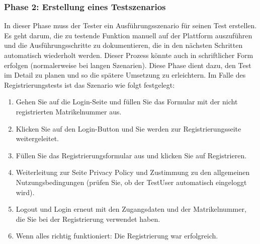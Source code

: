 \subsubsection{Phase 2: Erstellung eines Testszenarios}

In dieser Phase muss der Tester ein Ausführungsszenario für seinen 
Test erstellen. Es geht darum, die zu testende Funktion manuell
auf der Plattform auszuführen und die Ausführungsschritte zu 
dokumentieren, die in den nächsten Schritten automatisch wiederholt
werden. Dieser Prozess könnte auch in schriftlicher Form erfolgen
(normalerweise bei langen Szenarien). Diese Phase dient dazu, den 
Test im Detail zu planen und so die spätere Umsetzung zu erleichtern.
Im Falle des Registrierungstests ist das Szenario wie folgt festgelegt:

\begin{enumerate}
    \item Gehen Sie auf die Login-Seite und füllen Sie das Formular mit
    der nicht registrierten Matrikelnummer aus.
    \item Klicken Sie auf den Login-Button und Sie werden zur
    Registrierungsseite weitergeleitet.
    \item Füllen Sie das Registrierungsformular aus und klicken Sie
    auf Registrieren.
    \item Weiterleitung zur Seite Privacy Policy und Zustimmung zu
    den allgemeinen Nutzungsbedingungen
    (prüfen Sie, ob der TestUser automatisch eingeloggt wird).
    \item Logout und Login erneut mit den Zugangsdaten und der
    Matrikelnummer, die Sie bei der Registrierung verwendet haben.
    \item Wenn alles richtig funktioniert: Die Registrierung war erfolgreich.
\end{enumerate}